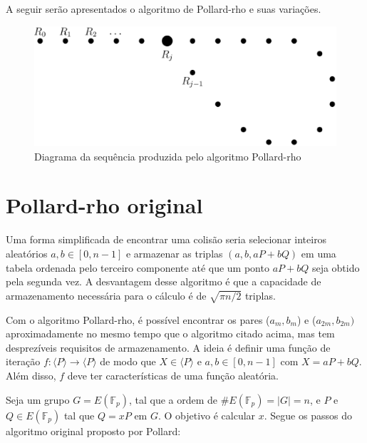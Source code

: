 A seguir serão apresentados o algoritmo de Pollard-rho e suas variações.

\begin{figure}[h]
\centering
\includegraphics[scale=0.4, bb=0 0 888 376]{figuras/rho.eps}
\caption{Diagrama da sequência produzida pelo algoritmo Pollard-rho}
\label{fig:rho}
\end{figure}

\section{Pollard-rho original} \label{Pollard_original}

Uma forma simplificada de encontrar uma colisão seria selecionar inteiros aleatórios $a, b \in [0, n-1]$ e armazenar as triplas $(a, b, aP + bQ)$ em uma tabela ordenada pelo terceiro componente até que um ponto $aP + bQ$ seja obtido pela segunda vez. A desvantagem desse algoritmo é que a capacidade de armazenamento necessária para o cálculo é de $\sqrt{\pi n/2}$ triplas.

Com o algoritmo Pollard-rho, é possível encontrar os pares ($a_m, b_m$) e ($a_{2m}, b_{2m})$ aproximadamente no mesmo tempo que o algoritmo citado acima, mas tem desprezíveis requisitos de armazenamento. A ideia é definir uma função de iteração $f : \langle P \rangle \to \langle P \rangle$ de modo que $X \in \langle P \rangle$ e $a, b \in [0, n-1]$ com $X = aP + bQ$. Além disso, \(f\) deve ter características de uma função aleatória. \cite{Guide}

Seja um grupo $G = E(\mathbb{F}_p)$, tal que a ordem de $\#E(\mathbb{F}_p) = |G| = n$, e \(P\) e \(Q \in E(\mathbb{F}_p)\) tal que $Q = xP$ em \(G\). O objetivo é calcular \(x\). Segue os passos do algoritmo original proposto por Pollard:

